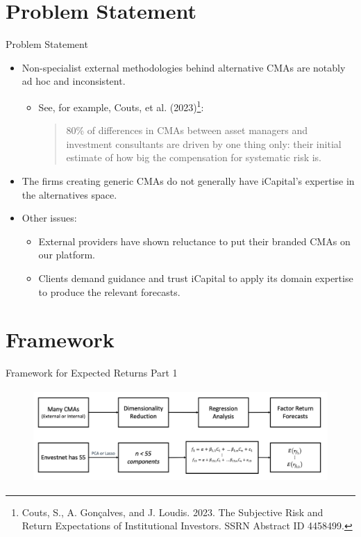 \documentclass[dvipsnames,mathserif, handout]{beamer}
\begin{document}
{	

\section{Problem Statement}

\begin{frame}{Problem Statement}
	\begin{itemize}
		\item Non-specialist external methodologies behind alternative CMAs are notably ad hoc and inconsistent.
		\begin{itemize}
			\item See, for example, Couts, et al. (2023)\footnote{\tiny Couts, S., A. Gon\c{c}alves, and J. Loudis. 2023. The Subjective Risk and Return Expectations of Institutional Investors. SSRN Abstract ID 4458499.}: 
            		\begin{quote}
            			80\% of differences in CMAs between asset managers and investment consultants are driven by one thing only: their initial estimate of how big the compensation for systematic risk is. 
            		\end{quote} \pause
		\end{itemize}
		\item The firms creating generic CMAs do not generally have iCapital’s expertise in the alternatives space. \pause
		\item Other issues:
		\begin{itemize}
			\item External providers have shown reluctance to put their branded CMAs on our platform.
			\item Clients demand guidance and trust iCapital to apply its domain expertise to produce the relevant forecasts. 
		\end{itemize}
	\end{itemize}
\end{frame}

\section{Framework}

\begin{frame}{Framework for Expected Returns Part 1}
	\begin{figure}[!ht]
	\centering
		\includegraphics[height=100pt]{framework1.pdf}
	\end{figure}
\end{frame}

}
\end{document}
